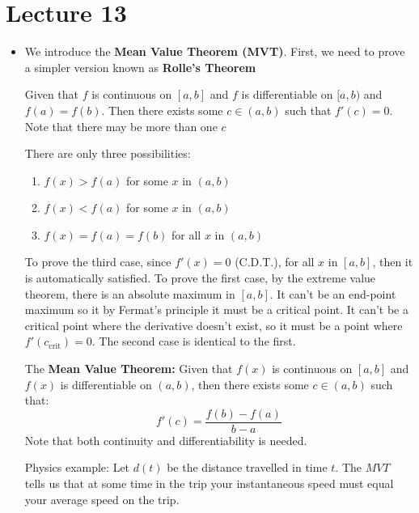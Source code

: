 \section{Lecture 13}
\begin{itemize}
    \item We introduce the \textbf{Mean Value Theorem (MVT)}. First, we need to prove a simpler version known as \textbf{Rolle's Theorem}
    \begin{theorem}
        Given that $f$ is continuous on $[a,b]$ and $f$ is differentiable on $[a,b)$ and $f(a)=f(b)$. Then there exists some $c \in (a,b)$ such that $f'(c)=0$. Note that there may be more than one $c$
    \end{theorem}
    \begin{prooof}
        There are only three possibilities:
        \begin{enumerate}
            \item $f(x)>f(a)$ for some $x$ in $(a,b)$
            \item $f(x)<f(a)$ for some $x$ in $(a,b)$
            \item $f(x)=f(a)=f(b)$ for all $x$ in $(a,b)$
        \end{enumerate}
        To prove the third case, since $f'(x)=0$ (C.D.T.), for all $x$ in $[a,b]$, then it is automatically satisfied. To prove the first case, by the extreme value theorem, there is an absolute maximum in $[a,b]$. It can't be an end-point maximum so it by Fermat's principle it must be a critical point. It can't be a critical point where the derivative doesn't exist, so it must be a point where $f'(c_\text{crit})=0$. The second case is identical to the first.
    \end{prooof}
    \begin{theorem}
        The \textbf{Mean Value Theorem:} Given that $f(x)$ is continuous on $[a,b]$ and $f(x)$ is differentiable on $(a,b)$, then there exists some $c\in (a,b)$ such that:
        \begin{equation}
            f'(c)=\frac{f(b)-f(a)}{b-a}
            \label{eq:}
        \end{equation}
        Note that both continuity and differentiability is needed.
    \end{theorem}
    \begin{example}
        Physics example: Let $d(t)$ be the distance travelled in time $t$. The $MVT$ tells us that at some time in the trip your instantaneous speed must equal your average speed on the trip.
    \end{example}

\end{itemize}
